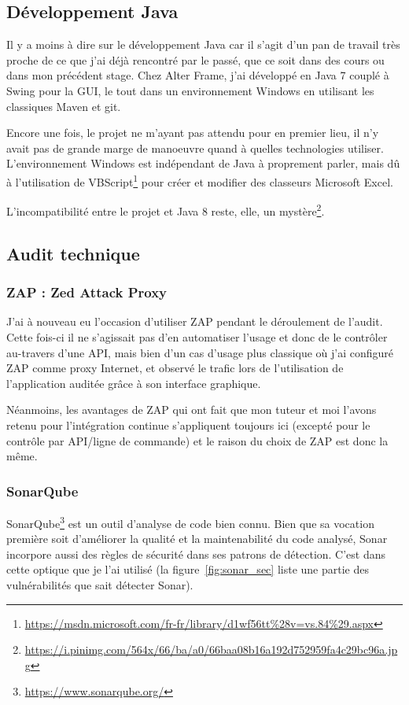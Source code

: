 \subsection{Développement Java}
Il y a moins à dire sur le développement Java car il s'agit d'un pan de travail très proche de ce que j'ai déjà rencontré par le passé, que ce soit dans des cours ou dans mon précédent stage. Chez Alter Frame, j'ai développé en Java 7 couplé à Swing pour la GUI, le tout dans un environnement Windows en utilisant les classiques Maven et git.

Encore une fois, le projet ne m'ayant pas attendu pour en premier lieu, il n'y avait pas de grande marge de manoeuvre quand à quelles technologies utiliser. L'environnement Windows est indépendant de Java à proprement parler, mais dû à l'utilisation de VBScript\footnote{\url{https://msdn.microsoft.com/fr-fr/library/d1wf56tt\%28v=vs.84\%29.aspx}} pour créer et modifier des classeurs Microsoft Excel.

L'incompatibilité entre le projet et Java 8 reste, elle, un mystère\footnote{\url{https://i.pinimg.com/564x/66/ba/a0/66baa08b16a192d752959fa4c29bc96a.jpg}}.

\subsection{Audit technique}
\subsubsection{ZAP : Zed Attack Proxy}
J'ai à nouveau eu l'occasion d'utiliser ZAP pendant le déroulement de l'audit. Cette fois-ci il ne s'agissait pas d'en automatiser l'usage et donc de le contrôler au-travers d'une API, mais bien d'un cas d'usage plus classique où j'ai configuré ZAP comme proxy Internet, et observé le trafic lors de l'utilisation de l'application auditée grâce à son interface graphique.

Néanmoins, les avantages de ZAP qui ont fait que mon tuteur et moi l'avons retenu pour l'intégration continue s'appliquent toujours ici (excepté pour le contrôle par API/ligne de commande) et le raison du choix de ZAP est donc la même.

\subsubsection{SonarQube}
SonarQube\footnote{\url{https://www.sonarqube.org/}} est un outil d'analyse de code bien connu. Bien que sa vocation première soit d'améliorer la qualité et la maintenabilité du code analysé, Sonar incorpore aussi des règles de sécurité dans ses patrons de détection. C'est dans cette optique que je l'ai utilisé (la figure~\ref{fig:sonar_sec} liste une partie des vulnérabilités que sait détecter Sonar).

